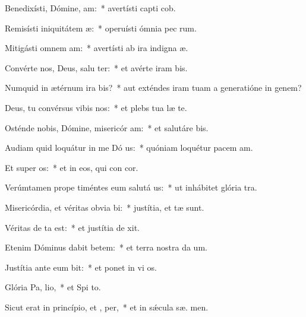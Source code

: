 \item Benedixísti, Dómine,  am:~* avertísti capti cob.
\item Remisísti iniquitátem  æ:~* operuísti ómnia pec rum.
\item Mitigásti omnem  am:~* avertísti ab ira indigna æ.
\item Convérte nos, Deus, salu ter:~* et avérte iram   bis.
\item Numquid in ætérnum ira bis?~* aut exténdes iram tuam a generatióne in genem?
\item Deus, tu convérsus vibis nos:~* et plebs tua læ  te.
\item Osténde nobis, Dómine, misericór am:~* et salutáre   bis.
\item Audiam quid loquátur in me Dó us:~* quóniam loquétur pacem   am.
\item Et super  os:~* et in eos, qui con  cor.
\item Verúmtamen prope timéntes eum salutá us:~* ut inhábitet glória   tra.
\item Misericórdia, et véritas obvia bi:~* justítia, et  tæ sunt.
\item Véritas de  ta est:~* et justítia de  xit.
\item Etenim Dóminus dabit betem:~* et terra nostra da  um.
\item Justítia ante eum bit:~* et ponet in vi  os.
\item Glória Pa,  lio,~* et Spi to.
\item Sicut erat in princípio, et ,  per,~* et in sǽcula sæ. men.
